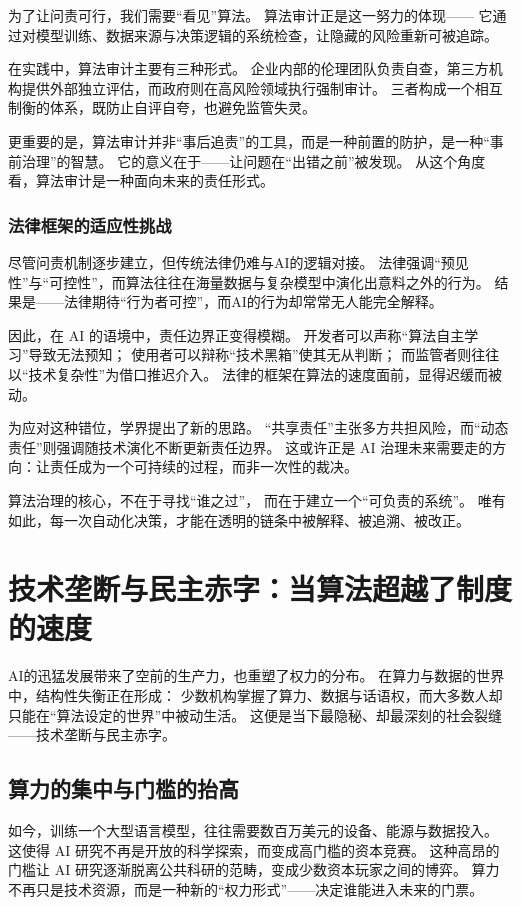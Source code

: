 为了让问责可行，我们需要“看见”算法。  
算法审计正是这一努力的体现——  
它通过对模型训练、数据来源与决策逻辑的系统检查，让隐藏的风险重新可被追踪。

在实践中，算法审计主要有三种形式。  
企业内部的伦理团队负责自查，第三方机构提供外部独立评估，而政府则在高风险领域执行强制审计。  
三者构成一个相互制衡的体系，既防止自评自夸，也避免监管失灵。

更重要的是，算法审计并非“事后追责”的工具，而是一种前置的防护，是一种“事前治理”的智慧。  
它的意义在于——让问题在“出错之前”被发现。  
从这个角度看，算法审计是一种面向未来的责任形式。

\subsubsection{法律框架的适应性挑战}

尽管问责机制逐步建立，但传统法律仍难与AI的逻辑对接。  
法律强调“预见性”与“可控性”，而算法往往在海量数据与复杂模型中演化出意料之外的行为。  
结果是——法律期待“行为者可控”，而AI的行为却常常无人能完全解释。

因此，在 AI 的语境中，责任边界正变得模糊。  
开发者可以声称“算法自主学习”导致无法预知；  
使用者可以辩称“技术黑箱”使其无从判断；  
而监管者则往往以“技术复杂性”为借口推迟介入。  
法律的框架在算法的速度面前，显得迟缓而被动。

为应对这种错位，学界提出了新的思路。  
“共享责任”主张多方共担风险，而“动态责任”则强调随技术演化不断更新责任边界。  
这或许正是 AI 治理未来需要走的方向：让责任成为一个可持续的过程，而非一次性的裁决。

算法治理的核心，不在于寻找“谁之过”，  
而在于建立一个“可负责的系统”。  
唯有如此，每一次自动化决策，才能在透明的链条中被解释、被追溯、被改正。  

\section{技术垄断与民主赤字：当算法超越了制度的速度}

AI的迅猛发展带来了空前的生产力，也重塑了权力的分布。  
在算力与数据的世界中，结构性失衡正在形成：  
少数机构掌握了算力、数据与话语权，而大多数人却只能在“算法设定的世界”中被动生活。  
这便是当下最隐秘、却最深刻的社会裂缝——技术垄断与民主赤字。

\subsection{算力的集中与门槛的抬高}

如今，训练一个大型语言模型，往往需要数百万美元的设备、能源与数据投入。  
这使得 AI 研究不再是开放的科学探索，而变成高门槛的资本竞赛。  
这种高昂的门槛让 AI 研究逐渐脱离公共科研的范畴，变成少数资本玩家之间的博弈。  
算力不再只是技术资源，而是一种新的“权力形式”——决定谁能进入未来的门票。

